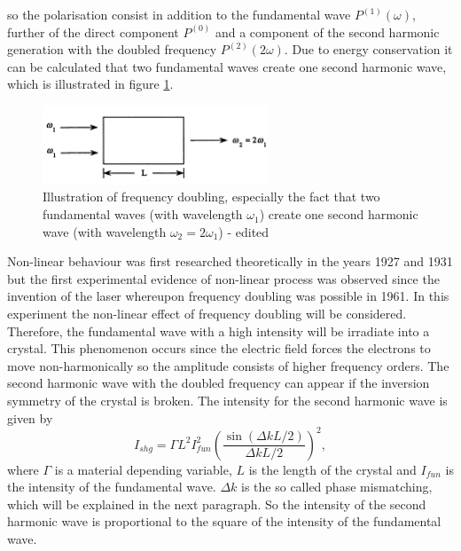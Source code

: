 \documentclass[10pt, a4paper, notitlepage, DIV=15]{scrartcl}
\begin{document}
so the polarisation consist in addition to the fundamental wave $P^{(1)}(\omega)$, further of the direct component $P^{(0)}$ and a component of the second harmonic generation with the doubled frequency $P^{(2)}(2\omega)$. Due to energy conservation it can be calculated that two fundamental waves create  one second harmonic wave, which is illustrated in figure \ref{fig:wavedoubling}.
\begin{figure}[h]
	\centering
	\includegraphics[width=0.6\textwidth]{wavelengthdoubling.png}
	\caption{Illustration of frequency doubling, especially the fact that two fundamental waves (with wavelength $\omega_1$) create one second harmonic wave (with wavelength $\omega_2=2\omega_1$) \cite{boyd} - edited}
	\label{fig:wavedoubling}
\end{figure}
\newline Non-linear behaviour was first researched theoretically in the years 1927 and 1931 but the first experimental evidence of non-linear process was observed since the invention of the laser whereupon frequency doubling was possible in 1961. \newline
In this experiment the non-linear effect  of frequency doubling will be considered. Therefore, the fundamental wave with a high intensity will be irradiate into a crystal. This phenomenon occurs since the electric field forces the electrons to move non-harmonically so the amplitude consists of higher frequency orders. The second harmonic wave with the doubled frequency can appear if the inversion symmetry of the crystal is broken.\cite{bergmann}
\newline
The intensity for the second harmonic wave is given by \cite{meschede}
\begin{equation}\label{eq:ishg}
I_{shg} = \Gamma L^2 I_{fun}^2 \left( \frac{\sin(\Delta k L / 2)}{\Delta k L / 2} \right)^2,
\end{equation}
where $\Gamma$ is a material depending variable, $L$ is the length of the crystal and $I_{fun}$ is the intensity of the fundamental wave. $\Delta k$ is the so called phase mismatching, which will be explained in the next paragraph. So the intensity of the second harmonic wave is proportional to the square of the intensity of the fundamental wave. \newline
\end{document}
